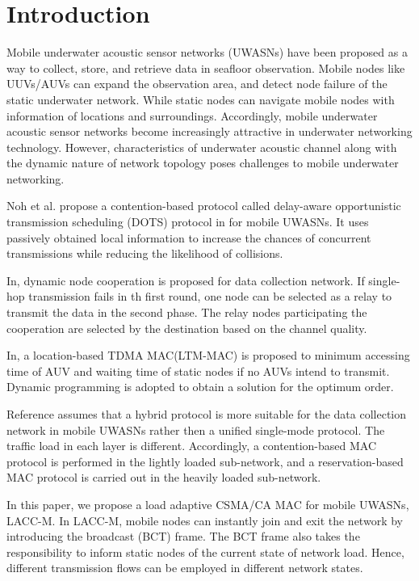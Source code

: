 \documentclass[conference]{IEEEtran}
\begin{document}
\section{Introduction}
Mobile underwater acoustic sensor networks (UWASNs) have been proposed as a way to collect, store, and retrieve data
in seafloor observation\cite{vasilescu2005data}. Mobile nodes like UUVs/AUVs can expand the observation area, and detect node failure of the static underwater network. While static nodes can navigate mobile nodes with information of locations and surroundings. Accordingly, mobile underwater acoustic sensor networks become increasingly attractive in underwater networking technology\cite{cui2006challenges}. However, characteristics of underwater acoustic channel along with the dynamic nature of network topology poses challenges to mobile underwater networking. 

Noh et al. propose a contention-based protocol called delay-aware opportunistic transmission scheduling (DOTS) protocol in\cite{noh2014dots} for mobile UWASNs. It uses passively obtained local information to increase the chances of concurrent
transmissions while reducing the likelihood of collisions. 

In\cite{Zhang2016Dynamic}, dynamic node cooperation is proposed for data collection network. If single-hop transmission fails in th first round, one node can be selected as a relay to  transmit the data in the second phase. The relay nodes participating the cooperation are selected by the destination based on the channel quality.

In\cite{mao2016ltm}, a location-based TDMA MAC(LTM-MAC) is proposed to minimum accessing time of AUV and waiting time of static nodes if no AUVs intend to transmit. Dynamic programming is adopted to obtain a solution for the optimum order. 

Reference \cite{deng2017hybrid} assumes that a hybrid protocol is more suitable for the data collection network in mobile UWASNs rather then a unified single-mode protocol. The traffic load in
each layer is different. Accordingly, a contention-based MAC protocol is performed in the lightly loaded sub-network, and a reservation-based MAC protocol is carried out in the heavily loaded sub-network.
 
In this paper, we propose a load adaptive CSMA/CA MAC for mobile UWASNs, LACC-M. In LACC-M, mobile nodes can instantly join and exit the network by introducing the broadcast (BCT) frame. The BCT frame also takes the responsibility to inform static nodes of the current state of network load. Hence, different transmission flows can be employed in different network states.
\end{document}
